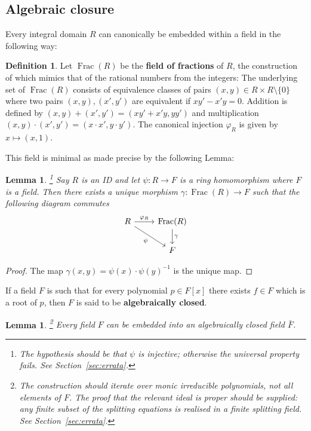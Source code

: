 \documentclass[12pt]{article}
\theoremstyle{plain}
\newtheorem{lemma}[thm]{Lemma}
\theoremstyle{definition}
\newtheorem{defn}[thm]{Definition} %
\begin{document}
\subsection{Algebraic closure}
\label{sec:fieldextensions}%
Every integral domain $R$ can canonically be embedded within a field in the following way:
\begin{defn}
Let $\operatorname{Frac}(R)$ be the \textbf{field of fractions} of $R$, the construction of which mimics that of the rational numbers from the integers: The underlying set of $\operatorname{Frac}(R)$ consists of equivalence classes of pairs $(x,y) \in R\times R\setminus\lbrace 0 \rbrace$ where two pairs $(x,y),(x',y')$ are equivalent if $xy' - x'y = 0$. Addition is defined by $(x,y) + (x',y') = (xy' + x'y,yy')$ and multiplication $(x,y)\cdot(x',y') = (x\cdot x',y\cdot y')$. The canonical injection $\varphi_R$ is given by $x \mapsto (x,1)$.
\end{defn}
%
This field is minimal as made precise by the following Lemma:
\begin{lemma}
\label{uniquenessoffff}\footnote{The hypothesis should be that $\psi$ is injective; otherwise the universal property fails. See Section~\ref{sec:errata}.}
Say $R$ is an ID and let $\psi: R \to F$ is a ring homomorphism where $F$ is a field. Then there exists a unique morphism $\gamma: \operatorname{Frac}(R) \to F$ such that the following diagram commutes
\[
\begin{tikzcd}
R\arrow[r,"{\varphi_R}"]\arrow[dr,swap,"{\psi}"] & \operatorname{Frac}(R)\arrow[d,"{\gamma}"]\\
& F
\end{tikzcd}
\]
\end{lemma}
\begin{proof}
The map $\gamma(x,y) = \psi(x)\cdot\psi(y)^{-1}$ is the unique map.
\end{proof}
If a field $F$ is such that for every polynomial $p \in F[x]$ there exists $f \in F$ which is a root of $p$, then $F$ is said to be \textbf{algebraically closed}.
\begin{lemma}
\label{algebraicclosure}\footnote{The construction should iterate over monic irreducible polynomials, not all elements of $F$. The proof that the relevant ideal is proper should be supplied: any finite subset of the splitting equations is realised in a finite splitting field. See Section~\ref{sec:errata}.}
Every field $F$ can be embedded into an algebraically closed field $\bar{F}$.
\end{lemma}
\end{document}
